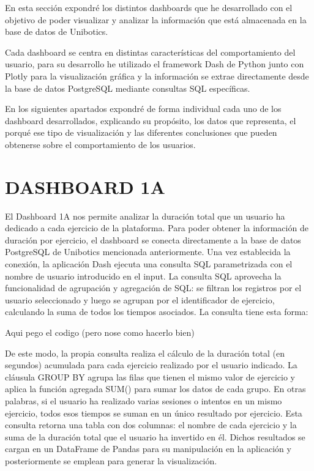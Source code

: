 \documentclass[a4paper, 12pt]{book}
\begin{document}
En esta sección expondré los distintos dashboards que he desarrollado con el objetivo de poder visualizar y analizar la información que está almacenada en la base de datos de Unibotics.

Cada dashboard se centra en distintas características del comportamiento del usuario, para su desarrollo he utilizado el framework Dash de Python junto con Plotly para la visualización gráfica y la información se extrae directamente desde la base de datos PostgreSQL mediante consultas SQL específicas.

En los siguientes apartados expondré de forma individual cada uno de los dashboard desarrollados, explicando su propósito, los datos que representa, el porqué ese tipo de visualización y las diferentes conclusiones que pueden obtenerse sobre el comportamiento de los usuarios.

\section{DASHBOARD 1A}
El Dashboard 1A nos permite analizar la duración total que un usuario ha dedicado a cada ejercicio de la plataforma.
Para poder obtener la información de duración por ejercicio, el dashboard se conecta directamente a la base de datos PostgreSQL de Unibotics mencionada anteriormente.
Una vez establecida la conexión, la aplicación Dash ejecuta una consulta SQL parametrizada con el nombre de usuario introducido en el input.
La consulta SQL aprovecha la funcionalidad de agrupación y agregación de SQL: se filtran los registros por el usuario seleccionado y luego se agrupan por el identificador de ejercicio, calculando la suma de todos los tiempos asociados. La consulta tiene esta forma:

Aqui pego el codigo (pero nose como hacerlo bien)

De este modo, la propia consulta realiza el cálculo de la duración total (en segundos) acumulada para cada ejercicio realizado por el usuario indicado. La cláusula GROUP BY agrupa las filas que tienen el mismo valor de ejercicio y aplica la función agregada SUM() para sumar los datos de cada grupo.
En otras palabras, si el usuario ha realizado varias sesiones o intentos en un mismo ejercicio, todos esos tiempos se suman en un único resultado por ejercicio. Esta consulta retorna una tabla con dos columnas: el nombre de cada ejercicio y la suma de la duración total que el usuario ha invertido en él. Dichos resultados se cargan en un DataFrame de Pandas para su manipulación en la aplicación y posteriormente se emplean para generar la visualización.
\end{document}
